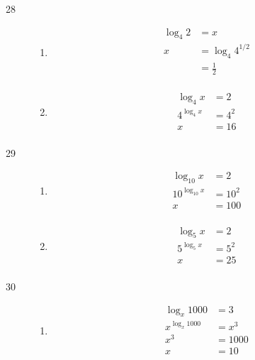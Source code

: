 \documentclass{exam}
\begin{document}
\begin{description}
    \item[28]
      \begin{enumerate}[a]
        \item 
          \begin{align*}
            \log_4 2 &= x \\
            x        &= \log_4 4^{1/2} \\
                     &= \frac{1}{2} \\
          \end{align*}

        \item 
          \begin{align*}
            \log_4 x     &= 2 \\
            4^{\log_4 x} &= 4^2 \\
            x            &= 16 \\
          \end{align*}
      \end{enumerate}

    \item[29]
      \begin{enumerate}[a]
        \item 
          \begin{align*}
            \log_{10} x      &= 2 \\
            10^{\log_{10} x} &= 10^2 \\
            x                &= 100 \\
          \end{align*}

        \item 
          \begin{align*}
            \log_{5} x     &= 2 \\
            5^{\log_{5} x} &= 5^2 \\
            x              &= 25 \\
          \end{align*}

      \end{enumerate}

    \item[30]
      \begin{enumerate}[a]
        \item 
          \begin{align*}
            \log_x 1000     &= 3 \\
            x^{\log_x 1000} &= x^3 \\
            x^3             &= 1000 \\
            x               &= 10 \\
          \end{align*}


\end{enumerate}
\end{description}
\end{document}
